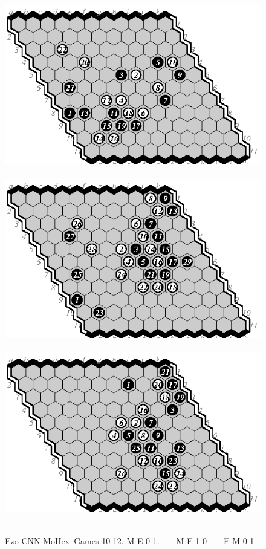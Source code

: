 \documentclass{icga}
\def\Ec{\mbox{\sc Ezo-CNN}}
\def\Mx{\mbox{\sc MoHex}}
\begin{document}
\begin{figure}[hbp]
\includegraphics[scale=1]{pix/11.me10.eps}\hspace*{-1.2cm}\
\includegraphics[scale=1]{pix/11.me11.eps}\hspace*{-1.2cm}\
\includegraphics[scale=1]{pix/11.em12.eps}\hspace*{-1.2cm}\
\caption{\Ec-\Mx\ Games 10-12. M-E 0-1. ~ ~ M-E 1-0 ~ ~ E-M 0-1}
\end{figure}
\end{document}
